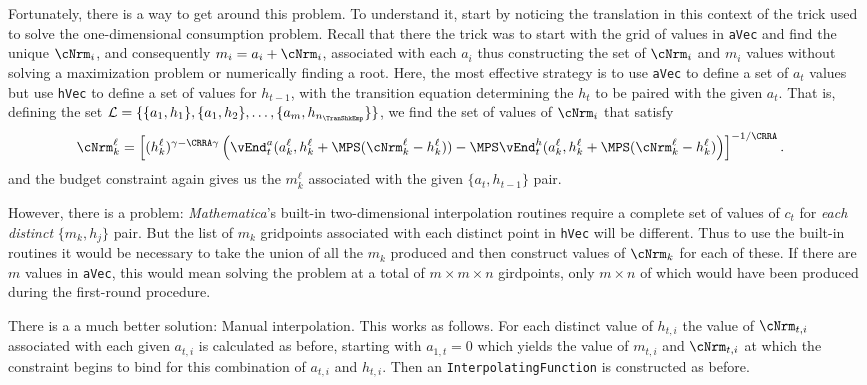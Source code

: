 \documentclass[titlepage, headings=optiontotocandhead]{\econtex}
\newcommand{\Mma}{\textit{Mathematica}}
\begin{document}
{  Fortunately, there is a way to get around this problem.  To
  understand it, start by noticing the translation in this context of
  the trick used to solve the one-dimensional consumption problem.
  Recall that there the trick was to start with the grid of values in
  \texttt{aVec} and find the unique ${\cNrm}_{i}$, and
  consequently ${m}_{i}={a}_{i}+{\cNrm}_{i}$, associated with
  each ${a}_{i}$ thus constructing the set of ${\cNrm}_{i}$ and
  ${m}_{i}$ values without solving a maximization problem or
  numerically finding a root.  Here, the most effective strategy is to
  use \texttt{aVec} to define a set of ${a}_{t}$ values but use
  \texttt{hVec} to define a set of values for $h_{t-1}$, with the
  transition equation determining the $h_{t}$ to be paired with the
  given ${a}_{t}$.  That is, defining the set $\mathcal{L} =
  \{\{{a}_{1},h_{1}\},\{{a}_{1},h_{2}\},\ldots,\{{a}_{m},h_{n_{\TranShkEmp}}\}\}$,
  we find the set of values of ${\cNrm}_{i}$ that satisfy
  \begin{equation}\begin{gathered}\begin{aligned}
        {\cNrm}_{k}^{\ell}  & = \left[(h_{k}^{\ell})^{\gamma-\CRRA\gamma}
          \left(\vEnd_{t}^{{a}}({a}_{k}^{\ell},h_{k}^{\ell}
            +\MPS({\cNrm}_{k}^{\ell}-h_{k}^{\ell}))
            -\MPS
            \vEnd_{t}^{h}({a}_{k}^{\ell},h_{k}^{\ell}+\MPS({\cNrm}_{k}^{\ell}-h_{k}^{\ell})\right)
        \right]^{-1/\CRRA}. \nonumber
      \end{aligned}\end{gathered}\end{equation}
  and the budget constraint again gives us the ${m}_{k}^{\ell}$
  associated with the given $\{{a}_{t},h_{t-1}\}$ pair.

  However, there is a problem: {\Mma}'s built-in two-dimensional
  interpolation routines require a complete set of values of ${c}_{t}$
  for \textit{each distinct} $\{{m}_{k},h_{j}\}$ pair.  But the list of
  ${m}_{k}$ gridpoints associated with each distinct point in
  \texttt{hVec} will be different.  Thus to use the built-in routines
  it would be necessary to take the union of all the ${m}_{k}$
  produced and then construct values of ${\cNrm}_{k}$ for each of
  these.  If there are $m$ values in \texttt{aVec}, this would
  mean solving the problem at a total of $m \times m \times n$
  girdpoints, only $m \times n$ of which would have been produced
  during the first-round procedure.

  There is a a much better solution: Manual interpolation.  This works
  as follows.  For each distinct value of $h_{t,i}$ the value of
  ${\cNrm}_{t,i}$ associated with each given ${a}_{t,i}$ is
  calculated as before, starting with ${a}_{1,t}=0$ which yields
  the value of ${m}_{t,i}$ and ${\cNrm}_{t,i}$ at which the
  constraint begins to bind for this combination of ${a}_{t,i}$
  and $h_{t,i}$.  Then an \texttt{InterpolatingFunction} is
  constructed as before.

}
\end{document}
